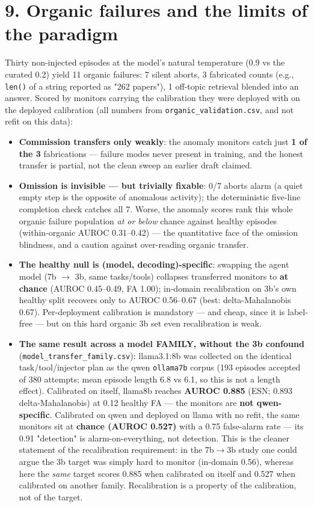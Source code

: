 \documentclass[11pt]{article}
\begin{document}
\section{9. Organic failures and the limits of the paradigm}


Thirty non-injected episodes at the model's natural temperature (0.9 vs the curated 0.2) yield 11 organic failures: 7 silent aborts, 3 fabricated counts (e.g., \texttt{len()} of a string reported as "262 papers"), 1 off-topic retrieval blended into an answer. Scored by monitors carrying the calibration they were deployed with on the deployed calibration (all numbers from \texttt{organic\_\allowbreak{}validation.csv}, and not refit on this data):


\begin{itemize}
\item \textbf{Commission transfers only weakly}: the anomaly monitors catch just \textbf{1 of the 3} fabrications --- failure modes never present in training, and the honest transfer is partial, not the clean sweep an earlier draft claimed.
\item \textbf{Omission is invisible --- but trivially fixable}: 0/7 aborts alarm (a quiet empty step is the opposite of anomalous activity); the deterministic five-line completion check catches all 7. Worse, the anomaly scores rank this whole organic failure population \emph{at or below} chance against healthy episodes (within-organic AUROC 0.31--0.42) --- the quantitative face of the omission blindness, and a caution against over-reading organic transfer.
\item \textbf{The healthy null is (model, decoding)-specific}: swapping the agent model (7b $\rightarrow$ 3b, same tasks/tools) collapses transferred monitors to \textbf{at chance} (AUROC 0.45--0.49, FA 1.00); in-domain recalibration on 3b's own healthy split recovers only to AUROC 0.56--0.67 (best: delta-Mahalanobis 0.67). Per-deployment calibration is mandatory --- and cheap, since it is label-free --- but on this hard organic 3b set even recalibration is weak.
\item \textbf{The same result across a model FAMILY, without the 3b confound} (\texttt{model\_\allowbreak{}transfer\_\allowbreak{}family.csv}): llama3.1:8b was collected on the identical task/tool/injector plan as the qwen \texttt{ollama7b} corpus (193 episodes accepted of 380 attempts; mean episode length 6.8 vs 6.1, so this is not a length effect). Calibrated on itself, llama8b reaches \textbf{AUROC 0.885} (ESN; 0.893 delta-Mahalanobis) at 0.12 healthy FA --- the monitors are \textbf{not qwen-specific}. Calibrated on qwen and deployed on llama with no refit, the same monitors sit at \textbf{chance (AUROC 0.527)} with a 0.75 false-alarm rate --- its 0.91 "detection" is alarm-on-everything, not detection. This is the cleaner statement of the recalibration requirement: in the 7b$\rightarrow$3b study one could argue the 3b target was simply hard to monitor (in-domain 0.56), whereas here the \emph{same} target scores 0.885 when calibrated on itself and 0.527 when calibrated on another family. Recalibration is a property of the calibration, not of the target.
\end{itemize}
\end{document}
